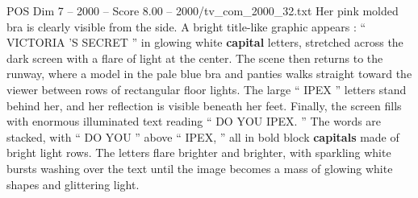 \begin{textsample}{POS Dim 7 – 2000 – Score 8.00 – 2000/tv\_com\_2000\_32.txt}
Her pink molded bra is clearly visible from the side.
A bright title-like graphic appears : “ VICTORIA ’S SECRET ” in glowing white \textbf{capital} letters, stretched across the dark screen with a flare of light at the center.
The scene then returns to the runway, where a model in the pale blue bra and panties walks straight toward the viewer between rows of rectangular floor lights.
The large “ IPEX ” letters stand behind her, and her reflection is visible beneath her feet.
Finally, the screen fills with enormous illuminated text reading “ DO YOU IPEX. ” The words are stacked, with “ DO YOU ” above “ IPEX, ” all in bold block \textbf{capitals} made of bright light rows.
The letters flare brighter and brighter, with sparkling white bursts washing over the text until the image becomes a mass of glowing white shapes and glittering light.

\end{textsample}
